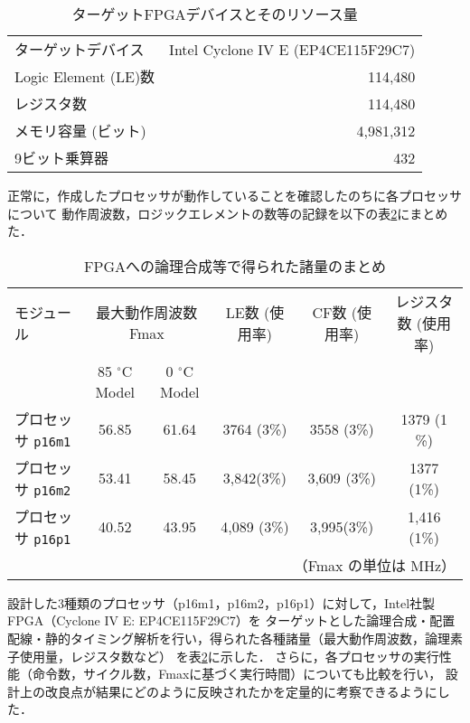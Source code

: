 \documentclass[autodetect-engine,dvi=dvipdfmx,ja=standard,
               a4j,11pt]{bxjsarticle}
\begin{document}
\begin{table}[hbtp]
    \caption{ターゲットFPGAデバイスとそのリソース量}
    \label{tab:ターゲットFPGAデバイスとそのリソース量}
    \begin{center}
    \begin{tabular}{l|r}
    \hline \hline
    ターゲットデバイス & Intel Cyclone IV E (EP4CE115F29C7) \\
    Logic Element (LE)数 & 114,480 \\
    レジスタ数 & 114,480 \\
    メモリ容量 (ビット) & 4,981,312\\
    9ビット乗算器 & 432 \\
    \hline
    \end{tabular}
    \end{center}
    \end{table}

正常に，作成したプロセッサが動作していることを確認したのちに各プロセッサについて
動作周波数，ロジックエレメントの数等の記録を以下の表\ref{tab:FPGAへの論理合成等で得られた諸量のまとめ}にまとめた．\\
\begin{table}[hbtp]
    \caption{FPGAへの論理合成等で得られた諸量のまとめ}
    \label{tab:FPGAへの論理合成等で得られた諸量のまとめ}
    \begin{center}
    {\small
    \begin{tabular}{l|ccccc}
    \hline
    \hline
    モジュール &
    \multicolumn{2}{c}{最大動作周波数 Fmax} & LE数 (使用率) & 
    CF数 (使用率) & レジスタ数 (使用率)  \\
    & 85 $^\circ$C Model & 0 $^\circ$C Model & & &  \\
    \hline
    プロセッサ \verb|p16m1| & 56.85& 61.64& 3764 (3\%) & 3558 (3\%)&  1379 (1 \%) \\
    プロセッサ \verb|p16m2| & 53.41& 58.45& 3,842(3\%)& 3,609 (3\%)&  1377 (1\%)\\
    プロセッサ \verb|p16p1| & 40.52& 43.95& 4,089 (3\%)& 3,995(3\%) & 1,416 (1\%)\\
    \hline
    \multicolumn{6}{r}{（Fmax の単位は MHz）}
    \end{tabular}
    }
    \end{center}
    \end{table}



設計した3種類のプロセッサ（p16m1，p16m2，p16p1）に対して，Intel社製FPGA（Cyclone IV E: EP4CE115F29C7）を
ターゲットとした論理合成・配置配線・静的タイミング解析を行い，得られた各種諸量（最大動作周波数，論理素子使用量，レジスタ数など）
を表\ref{tab:FPGAへの論理合成等で得られた諸量のまとめ}に示した．
さらに，各プロセッサの実行性能（命令数，サイクル数，Fmaxに基づく実行時間）についても比較を行い，
設計上の改良点が結果にどのように反映されたかを定量的に考察できるようにした．
\end{document}
